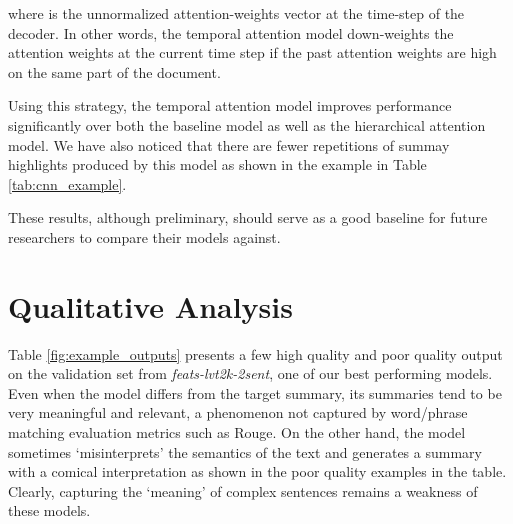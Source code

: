 \documentclass[11pt]{article}
\begin{document}
where  is the unnormalized attention-weights vector at the  time-step of the decoder. In other words, the temporal attention model down-weights the attention weights at the current time step if the past attention weights are high on the same part of the document. 

Using this strategy, the temporal attention model improves performance significantly over both the baseline model as well as the hierarchical attention model. We have also noticed that there are fewer repetitions of summay highlights produced by this model as shown in the example in Table \ref{tab:cnn_example}.





These results, although preliminary, should serve as a good baseline for future researchers to compare their models against. 





 \section{Qualitative Analysis}\label{sec:analysis}

Table \ref{fig:example_outputs} presents a few high quality and poor quality output on the validation set from {\it feats-lvt2k-2sent}, one of our best performing models. Even when the model differs from the target summary, its summaries tend to be very meaningful and relevant, a phenomenon not captured by word/phrase matching evaluation metrics such as Rouge. On the other hand, the model sometimes `misinterprets' the semantics of the text and generates a summary with a comical interpretation as shown in the poor quality examples in the table. Clearly, capturing the `meaning' of complex sentences remains a weakness of these models.
\end{document}
